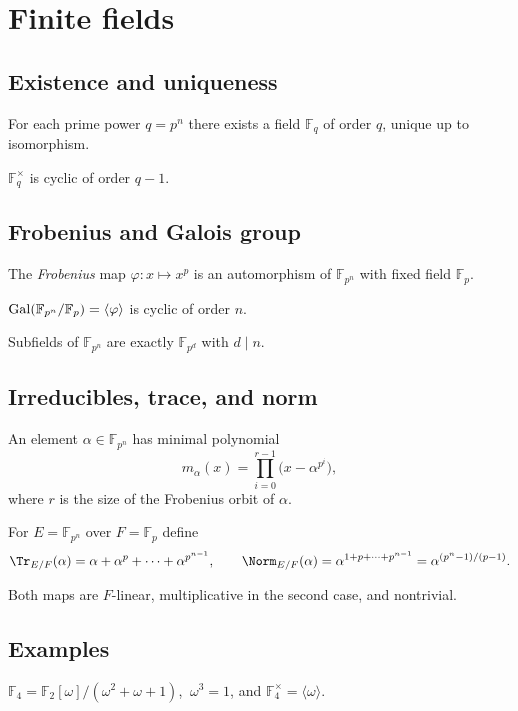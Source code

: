 \section{Finite fields}\label{sec:finite-fields}

\subsection{Existence and uniqueness}
\begin{theorem}
For each prime power $q=p^n$ there exists a field $\mathbb{F}_q$ of order $q$, unique up to isomorphism.
\end{theorem}
\begin{theorem}
$\mathbb{F}_q^\times$ is cyclic of order $q-1$.
\end{theorem}

\subsection{Frobenius and Galois group}
\begin{proposition}
The \emph{Frobenius} map $\varphi:x\mapsto x^p$ is an automorphism of $\mathbb{F}_{p^n}$ with fixed field $\mathbb{F}_p$.
\end{proposition}
\begin{theorem}
$\operatorname{Gal}(\mathbb{F}_{p^n}/\mathbb{F}_p)=\langle \varphi\rangle$ is cyclic of order $n$.
\end{theorem}
\begin{corollary}
Subfields of $\mathbb{F}_{p^n}$ are exactly $\mathbb{F}_{p^d}$ with $d\mid n$.
\end{corollary}

\subsection{Irreducibles, trace, and norm}
\begin{proposition}
An element $\alpha\in\mathbb{F}_{p^n}$ has minimal polynomial
\[
m_\alpha(x)=\prod_{i=0}^{r-1}\bigl(x-\alpha^{p^{i}}\bigr),
\]
where $r$ is the size of the Frobenius orbit of $\alpha$.
\end{proposition}
\begin{definition}
For $E=\mathbb{F}_{p^n}$ over $F=\mathbb{F}_p$ define
\[
\Tr_{E/F}(\alpha)=\alpha+\alpha^p+\cdots+\alpha^{p^{n-1}},\qquad
\Norm_{E/F}(\alpha)=\alpha^{1+p+\cdots+p^{n-1}}=\alpha^{(p^{n}-1)/(p-1)}.
\]
\end{definition}
Both maps are $F$-linear, multiplicative in the second case, and nontrivial.

\subsection{Examples}
\begin{example}
$\mathbb{F}_4=\mathbb{F}_2[\omega]/(\omega^2+\omega+1)$, $\ \omega^3=1$, and $\mathbb{F}_4^\times=\langle \omega\rangle$.
\end{example}
